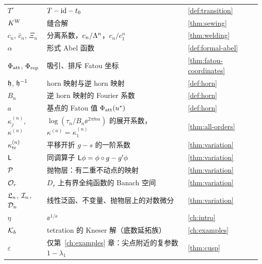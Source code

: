 \begin{center}
\begin{tabular}{p{}p{}p{}}
$T^\circ$ & $T-\mathrm{id}-t_0$ & \cref{def:transition}\\
$K^{\mathrm W}$ & 缝合解 & \cref{thm:sewing}\\
$c_n$, $\hat c_n$, $\Xi_n$ & 分离系数，$c_n/\Lambda^n$，$c_n/c_1^n$ & \cref{thm:welding}\\
$\alpha$ & 形式 Abel 函数 & \cref{def:formal-abel}\\
$\Phi_{\mathrm{att}}$, $\Phi_{\mathrm{rep}}$ & 吸引、排斥 Fatou 坐标 & \cref{thm:fatou-coordinates}\\
$\mathfrak h$, $\mathfrak h^{-1}$ & horn 映射与逆 horn 映射 & \cref{def:horn}\\
$B_n$ & 逆 horn 映射的 Fourier 系数 & \cref{def:horn}\\
$a$ & 基点的 Fatou 值 $\Phi_{\mathrm{att}}(u^{*})$ & \cref{def:horn}\\
$\kappa^{(n)}_j$, $\kappa^{(n)}$ & $\log(\tau_n/B_n\ee^{2\pi\ii na})$ 的展开系数，$\kappa^{(n)}=\kappa^{(n)}_1$ & \cref{thm:all-orders}\\
$\kappa_{\mathrm{tr}}^{(n)}$ & 平移开折 $g-s$ 的一阶系数 & \cref{thm:variation}\\
$\mathsf L$ & 同调算子 $\mathsf L\phi=\phi\circ g-g'\phi$ & \cref{thm:variation}\\
$\mathcal P$ & 抛物层：有二重不动点的映射 & \cref{thm:variation}\\
$\mathcal O_r$ & $D_r$ 上有界全纯函数的 Banach 空间 & \cref{thm:variation}\\
$\mathfrak L_n$, $\mathcal I_n$, $\mathcal D_n$ & 线性泛函、不变量、抛物层上的对数微分 & \cref{thm:variation}\\
$\eta$ & $\ee^{1/\ee}$ & \cref{ch:intro}\\
$\mathcal K_b$ & tetration 的 Kneser 解（底数延拓族） & \cref{ch:examples}\\
$\varepsilon$ & 仅第~\ref{ch:examples} 章：尖点附近的复参数 $1-\lambda_1$ & \cref{thm:cusp}\\
\bottomrule
\end{tabular}
\end{center}
